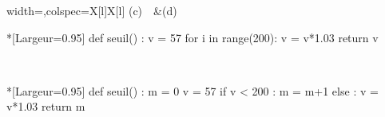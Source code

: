 \begin{enumerate}
	\begin{tblr}{width=\linewidth,colspec={X[l]X[l]}}
		(c)~~&(d)~~
	\end{tblr}
	
	\begin{minipage}{0.49\linewidth}
\begin{CodePythonLstAlt}*[Largeur=0.95\linewidth]{}
def seuil() :
	v = 57
	for i in range(200):
		v = v*1.03
	return v
\end{CodePythonLstAlt}
	\end{minipage}\hfill~
	\begin{minipage}{0.49\linewidth}
\begin{CodePythonLstAlt}*[Largeur=0.95\linewidth]{}
def seuil() :
	m = 0
	v = 57
	if v < 200 :
		m = m+1
	else :
		v = v*1.03
	return m
\end{CodePythonLstAlt}
	\end{minipage}
\end{enumerate}

